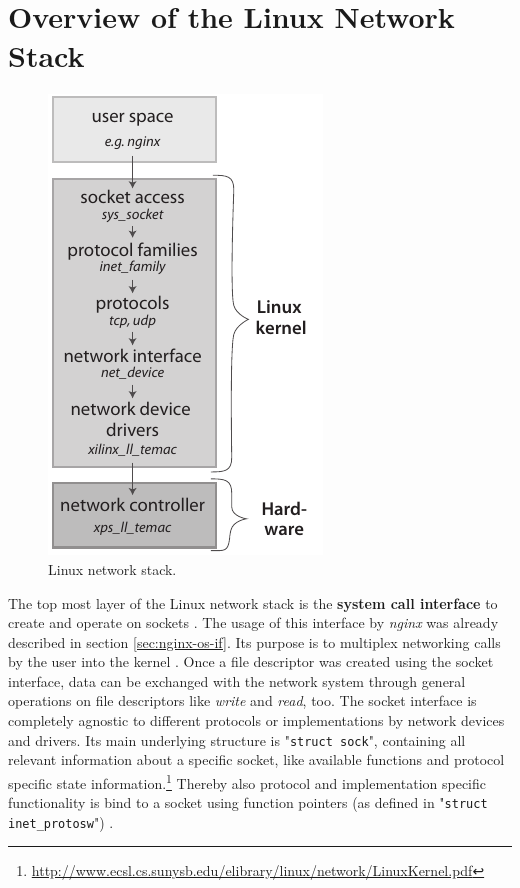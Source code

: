 \chapter{Overview of the Linux Network Stack}

\begin{figure}
	\centering
	\includegraphics[scale=1]{images/net-stack.pdf}
	\caption{Linux network stack.}
	\label{fig:net-stack}
\end{figure}
The top most layer of the Linux network stack is the \textbf{system call interface} to create and operate on sockets \cite{netstackana}. The usage of this interface by \textit{nginx} was already described in section \ref{sec:nginx-os-if}. Its purpose is to multiplex networking calls by the user into the kernel \cite{netstackana}. Once a file descriptor was created using the socket interface, data can be exchanged with the network system through general operations on file descriptors like \textit{write} and \textit{read}, too. The socket interface is completely agnostic to different protocols or implementations by network devices and drivers. Its main underlying structure is "\texttt{struct sock}", containing all relevant information about a specific socket, like available functions and protocol specific state information.\footnote{\url{http://www.ecsl.cs.sunysb.edu/elibrary/linux/network/LinuxKernel.pdf}} Thereby also protocol and implementation specific functionality is bind to a socket using function pointers (as defined in "\texttt{struct inet\_protosw}") \cite{netstackana}.

